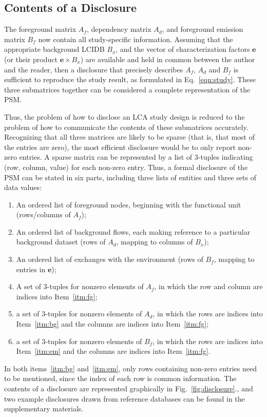 \subsection{Contents of a Disclosure}

The foreground matrix $A_f$, dependency matrix $A_d$, and foreground emission matrix $B_f$ now contain all study-specific information.  Assuming that the appropriate background LCIDB $B_x$, and the vector of characterization factors $\mathbf{e}$ (or their product $\mathbf{e}\times B_x$) are available and held in common between the author and the reader, then a disclosure that precisely describes $A_f$, $A_d$ and $B_f$ is sufficient to reproduce the study result, as formulated in Eq.~\ref{eqn:study}.  These three submatrices together can be considered a complete representation of the PSM.


Thus, the problem of how to disclose an LCA study design is reduced to the problem of how to communicate the contents of these submatrices accurately.  Recognizing that all three matrices are likely to be sparse (that is, that most of the entries are zero), the most efficient disclosure would be to only report non-zero entries.  A sparse matrix can be represented by a list of 3-tuples indicating (row, column, value) for each non-zero entry.  Thus, a formal disclosure of the PSM can be stated in six parts, including three lists of entities and three sets of data values:
\begin{enumerate}[label={\em d-\roman*}., ref={\em d-\roman*}]
\item\label{itm:fg} An ordered list of foreground nodes, beginning with the functional unit (rows/columns of $A_f$);
\item\label{itm:bg} An ordered list of background flows, each making reference to a particular background dataset (rows of $A_d$, mapping to columns of $B_x$);
\item\label{itm:em} An ordered list of exchanges with the environment (rows of $B_f$, mapping to entries in $\mathbf{e}$);
\item\label{itm:af} A set of 3-tuples for nonzero elements of $A_f$, in which the row and column are indices into Item~\ref{itm:fg};
\item\label{itm:ad} a set of 3-tuples for nonzero elements of $A_d$, in which the rows are indices into Item~\ref{itm:bg} and the columns are indices into Item~\ref{itm:fg};
\item\label{itm:bf} a set of 3-tuples for nonzero elements of $B_f$, in which the rows are indices into Item~\ref{itm:em} and the columns are indices into Item~\ref{itm:fg}.
\end{enumerate}
In both items~\ref{itm:bg} and~\ref{itm:em}, only rows containing non-zero entries need to be mentioned, since the index of each row is common information.  The contents of a disclosure are represented graphically in Fig.~\ref{fig:disclosure}., and two example disclosures drawn from reference databases can be found in the supplementary materials.

